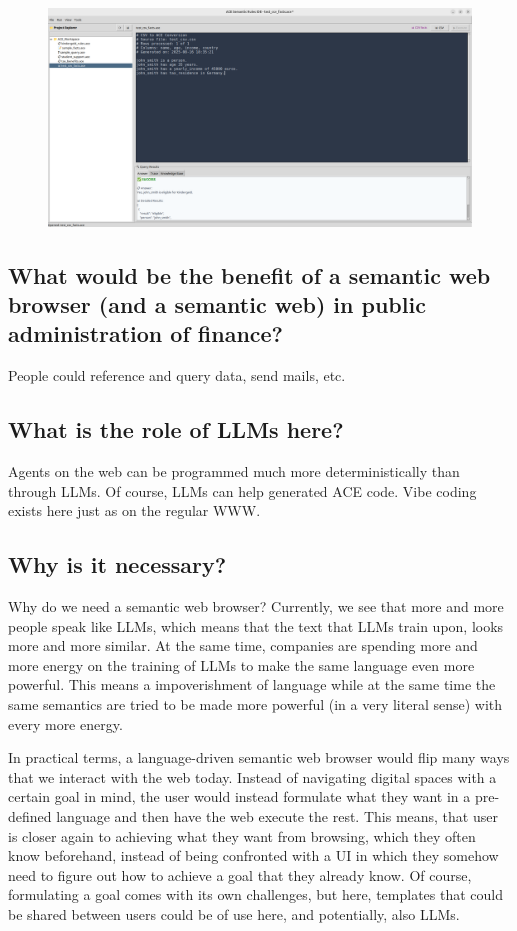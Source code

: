 \documentclass[12pt,a4paper]{article}
\begin{document}
\begin{figure}[h]
    \includegraphics[width=16cm]{ace_code_screenshot_4}
\end{figure}

\subsection{What would be the benefit of a semantic web browser (and a semantic web) in public administration of finance?}

People could reference and query data, send mails, etc.

\subsection{What is the role of LLMs here?}

Agents on the web can be programmed much more deterministically than through LLMs. Of course, LLMs can help generated ACE code. Vibe coding exists here just as on the regular WWW.

\subsection{Why is it necessary?}

Why do we need a semantic web browser? Currently, we see that more and more people speak like LLMs, which means that the text that LLMs train upon, looks more and more similar. At the same time, companies are spending more and more energy on the training of LLMs to make the same language even more powerful. This means a impoverishment of language while at the same time the same semantics are tried to be made more powerful (in a very literal sense) with every more energy.

In practical terms, a language-driven semantic web browser would flip many ways that we interact with the web today. Instead of navigating digital spaces with a certain goal in mind, the user would instead formulate what they want in a pre-defined language and then have the web execute the rest. This means, that user is closer again to achieving what they want from browsing, which they often know beforehand, instead of being confronted with a UI in which they somehow need to figure out how to achieve a goal that they already know. Of course, formulating a goal comes with its own challenges, but here, templates that could be shared between users could be of use here, and potentially, also LLMs.
\end{document}
